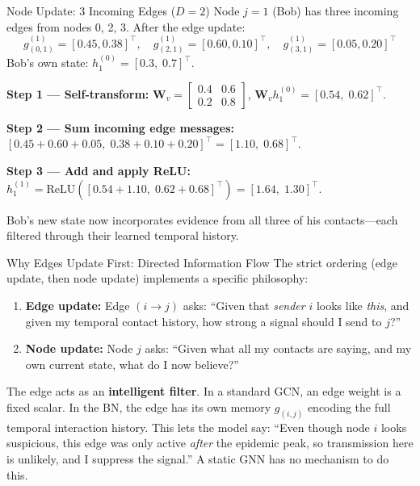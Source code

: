 \begin{examplebox}{Node Update: 3 Incoming Edges ($D=2$)}
Node $j=1$ (Bob) has three incoming edges from nodes 0, 2, 3. After the edge update:
\[
g_{(0,1)}^{(1)} = [0.45, 0.38]^\top, \quad g_{(2,1)}^{(1)} = [0.60, 0.10]^\top, \quad g_{(3,1)}^{(1)} = [0.05, 0.20]^\top
\]
Bob's own state: $h_1^{(0)} = [0.3,\; 0.7]^\top$.

\textbf{Step 1 — Self-transform:}
$\mathbf{W}_v = \begin{bmatrix}0.4&0.6\\0.2&0.8\end{bmatrix}$, \; $\mathbf{W}_v h_1^{(0)} = [0.54,\; 0.62]^\top$.

\textbf{Step 2 — Sum incoming edge messages:}
$[0.45+0.60+0.05,\; 0.38+0.10+0.20]^\top = [1.10,\; 0.68]^\top$.

\textbf{Step 3 — Add and apply ReLU:}
$h_1^{(1)} = \text{ReLU}([0.54+1.10,\; 0.62+0.68]^\top) = [1.64,\; 1.30]^\top$.

Bob's new state now incorporates evidence from all three of his contacts---each filtered through their learned temporal history.
\end{examplebox}

\begin{keyinsight}{Why Edges Update First: Directed Information Flow}
The strict ordering (edge update, then node update) implements a specific philosophy:

\begin{enumerate}[noitemsep]
    \item \textbf{Edge update:} Edge $(i \to j)$ asks: ``Given that \emph{sender} $i$ looks like \emph{this}, and given my temporal contact history, how strong a signal should I send to $j$?''
    \item \textbf{Node update:} Node $j$ asks: ``Given what all my contacts are saying, and my own current state, what do I now believe?''
\end{enumerate}

The edge acts as an \textbf{intelligent filter}. In a standard GCN, an edge weight is a fixed scalar. In the BN, the edge has its own memory $g_{(i,j)}$ encoding the full temporal interaction history. This lets the model say: ``Even though node $i$ looks suspicious, this edge was only active \emph{after} the epidemic peak, so transmission here is unlikely, and I suppress the signal.'' A static GNN has no mechanism to do this.
\end{keyinsight}

